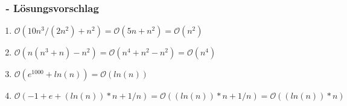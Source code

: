 \begin{frame}%
  \frametitle{\sBtitle\ - L\"osungsvorschlag}%

\begin{enumerate}
  \item $\mathcal{O}(10n^3/(2n^2)+n^2) = \mathcal{O}(5n + n^2) = \mathcal{O}(n^2)$
  \item $\mathcal{O}(n(n^3+n)-n^2) = \mathcal{O}(n^4 + n^2 - n^2) = \mathcal{O}(n^4)$
  \item $\mathcal{O}(e^{1000}+ln (n)) = \mathcal{O}(ln (n))$
  \item $\mathcal{O}(-1+e+(ln(n))*n +1/n) = \mathcal{O}((ln(n)) * n + 1/n) = \mathcal{O}((ln(n)) * n)$
\end{enumerate}
\end{frame}
